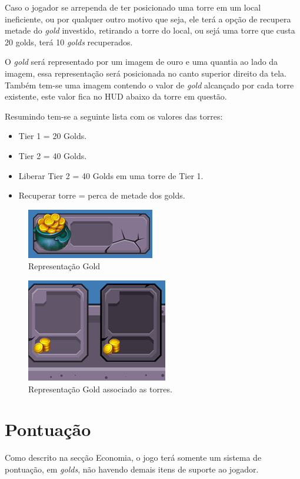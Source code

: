 \documentclass[11pt]{article} %
\begin{document}
Caso o jogador se arrependa de ter posicionado uma torre em um local ineficiente, ou por qualquer outro motivo que seja, ele terá a opção de recupera metade do \textit{gold} investido, retirando a torre do local, ou sejá uma torre que custa 20 golds, terá 10 \textit{golds} recuperados.
 
 
O \textit{gold} será representado por um imagem de ouro e uma quantia ao lado da imagem, essa representação será posicionada no canto superior direito da tela. Também tem-se uma imagem contendo o valor de \textit{gold} alcançado por cada torre existente, este valor fica no HUD abaixo da torre em questão.

Resumindo tem-se a seguinte lista com os valores das torres:
\begin{itemize}
 \item Tier 1 = 20 Golds.
 \item Tier 2 = 40 Golds.
 \item Liberar Tier 2 = 40 Golds em uma torre de Tier 1.
 \item Recuperar torre = perca de metade dos golds.
\end{itemize} 

\begin{figure}[!htp]
\centering
\includegraphics[scale=1.25]{res/gold.png}
\caption{Representação Gold}
\label{Tela Equip}
\end{figure}

\begin{figure}[!htp]
\centering
\includegraphics[scale=1.0]{res/torresGold.png}
\caption{Representação Gold associado as torres.}
\label{Tela Equip}
\end{figure}

\newpage

\section{Pontuação}
Como descrito na secção Economia, o jogo terá somente um sistema de pontuação, em \textit{golds}, não havendo demais itens de suporte ao jogador.
\end{document}
